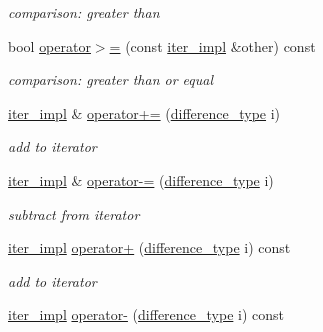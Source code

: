 \begin{DoxyCompactItemize}
\begin{DoxyCompactList}\small\item\em comparison\+: greater than \end{DoxyCompactList}\item 
bool \mbox{\hyperlink{classnlohmann_1_1detail_1_1iter__impl_a634f85da575cb60b012a687efa26e11a}{operator$>$=}} (const \mbox{\hyperlink{classnlohmann_1_1detail_1_1iter__impl}{iter\+\_\+impl}} \&other) const
\begin{DoxyCompactList}\small\item\em comparison\+: greater than or equal \end{DoxyCompactList}\item 
\mbox{\hyperlink{classnlohmann_1_1detail_1_1iter__impl}{iter\+\_\+impl}} \& \mbox{\hyperlink{classnlohmann_1_1detail_1_1iter__impl_a3eef94f9d167046e7f773aeb6b78090c}{operator+=}} (\mbox{\hyperlink{classnlohmann_1_1detail_1_1iter__impl_a2f7ea9f7022850809c60fc3263775840}{difference\+\_\+type}} i)
\begin{DoxyCompactList}\small\item\em add to iterator \end{DoxyCompactList}\item 
\mbox{\hyperlink{classnlohmann_1_1detail_1_1iter__impl}{iter\+\_\+impl}} \& \mbox{\hyperlink{classnlohmann_1_1detail_1_1iter__impl_abcc9d51bc52f2e8483bbe4018f05e978}{operator-\/=}} (\mbox{\hyperlink{classnlohmann_1_1detail_1_1iter__impl_a2f7ea9f7022850809c60fc3263775840}{difference\+\_\+type}} i)
\begin{DoxyCompactList}\small\item\em subtract from iterator \end{DoxyCompactList}\item 
\mbox{\hyperlink{classnlohmann_1_1detail_1_1iter__impl}{iter\+\_\+impl}} \mbox{\hyperlink{classnlohmann_1_1detail_1_1iter__impl_a8ef76aeb5a5032768f0f61f48ac189c0}{operator+}} (\mbox{\hyperlink{classnlohmann_1_1detail_1_1iter__impl_a2f7ea9f7022850809c60fc3263775840}{difference\+\_\+type}} i) const
\begin{DoxyCompactList}\small\item\em add to iterator \end{DoxyCompactList}\item 
\mbox{\hyperlink{classnlohmann_1_1detail_1_1iter__impl}{iter\+\_\+impl}} \mbox{\hyperlink{classnlohmann_1_1detail_1_1iter__impl_a0dd9c415b94a02ff2aa25da75e52da30}{operator-\/}} (\mbox{\hyperlink{classnlohmann_1_1detail_1_1iter__impl_a2f7ea9f7022850809c60fc3263775840}{difference\+\_\+type}} i) const

\end{DoxyCompactItemize}
